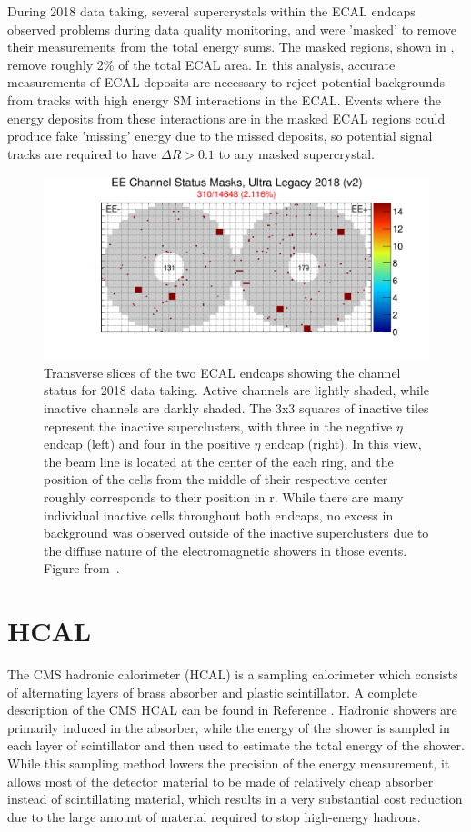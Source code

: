 During 2018 data taking, several supercrystals within the ECAL endcaps observed problems during data quality monitoring, and were 'masked' to remove their measurements from the total energy sums.
The masked regions, shown in , remove roughly 2$\%$ of the total ECAL area.
In this analysis, accurate measurements of ECAL deposits are necessary to reject potential backgrounds from tracks with high energy SM interactions in the ECAL.
Events where the energy deposits from these interactions are in the masked ECAL regions could produce fake 'missing' energy due to the missed deposits, so potential signal tracks are required to have $\Delta R>0.1$ to any masked supercrystal.

\begin{figure}[htbp]
    \includegraphics[width=\textwidth]{figures/EEChannelMasks.png}
    \centering
	\caption[Masked ECAL cells]{Transverse slices of the two ECAL endcaps showing the channel status for 2018 data taking. Active channels are lightly shaded, while inactive channels are darkly shaded. The 3x3 squares of inactive tiles represent the inactive superclusters, with three in the negative $\eta$ endcap (left) and four in the positive $\eta$ endcap (right). In this view, the beam line is located at the center of the each ring, and the position of the cells from the middle of their respective center roughly corresponds to their position in r. While there are many individual inactive cells throughout both endcaps, no excess in background was observed outside of the inactive superclusters due to the diffuse nature of the electromagnetic showers in those events. Figure from~\cite{EcalDPG}.}
    \label{fig:EEmasks}
\end{figure}

\section{HCAL}
The CMS hadronic calorimeter (HCAL) is a sampling calorimeter which consists of alternating layers of brass absorber and plastic scintillator. 
A complete description of the CMS HCAL can be found in Reference \cite{HCALtdr}.
Hadronic showers are primarily induced in the absorber, while the energy of the shower is sampled in each layer of scintillator and then used to estimate the total energy of the shower. 
While this sampling method lowers the precision of the energy measurement, it allows most of the detector material to be made of relatively cheap absorber instead of scintillating material, which results in a very substantial cost reduction due to the large amount of material required to stop high-energy hadrons.


